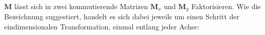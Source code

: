\documentclass{article}
\begin{document}


\noindent $\mathbf{M}$ lässt sich in zwei kommutierende Matrizen $\mathbf{M}_x$ und $\mathbf{M}_y$ Faktorisieren. Wie die Bezeichnung suggestiert, handelt es sich dabei jeweils um einen Schritt der eindimensionalen Transformation, einmal entlang jeder Achse:
\end{document}
